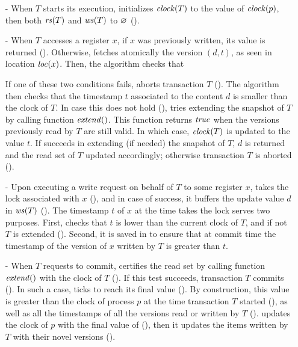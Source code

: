\begin{itemize}
\item[-] %
  When $T$ starts its execution,  initializes $\clockOf{T}$ to the value of $\clockOf{p}$, then both $\readSetOf{T}$ and $\writeSetOf{T}$ to $\emptySet$ ().
\item[-] %
  When $T$ accesses a register $x$, if $x$ was previously written, its value is returned ().
  Otherwise,  fetches atomically the version $(d,t)$, as seen in location $\locationOf{x}$.
  Then, the algorithm checks that 
  If one of these two conditions fails,  aborts transaction $T$ ().
  The algorithm then checks that the timestamp $t$ associated to the content $d$ is smaller than the clock of $T$.
  In case this does not hold (),  tries extending the snapshot of $T$ by calling function $\stmExtend{}$.
  This function returns $\true$ when the versions previously read by $T$ are still valid.
  In which case, $\clockOf{T}$ is updated to the value $t$.
  If  succeeds in extending (if needed) the snapshot of $T$, $d$ is returned and the read set of $T$ updated accordingly;
  otherwise transaction $T$ is aborted ().
\item[-] %
  Upon executing a write request on behalf of $T$ to some register $x$,  takes the lock associated with $x$ (), and in case of success, it buffers the update value $d$ in $\writeSetOf{T}$ ().
  The timestamp $t$ of $x$ at the time  takes the lock serves two purposes.
  First,  checks that $t$ is lower than the current clock of $T$, and if not $T$ is extended ().
  Second, it is saved in  to ensure that at commit time the timestamp of the version of $x$ written by $T$ is greater than $t$.
\item[-] %
  When $T$ requests to commit,  certifies the read set by calling function $\stmExtend{}$ with the clock of $T$ ().
  If this test succeeds, transaction $T$ commits ().
  In such a case,  ticks to reach its final value ().
  By construction, this value is greater than the clock of process $p$ at the time transaction $T$ started (), as well as all the timestamps of all the versions read or written by $T$ ().
   updates the clock of $p$ with the final value of  (), then it updates the items written by $T$ with their novel versions ().
\end{itemize}

